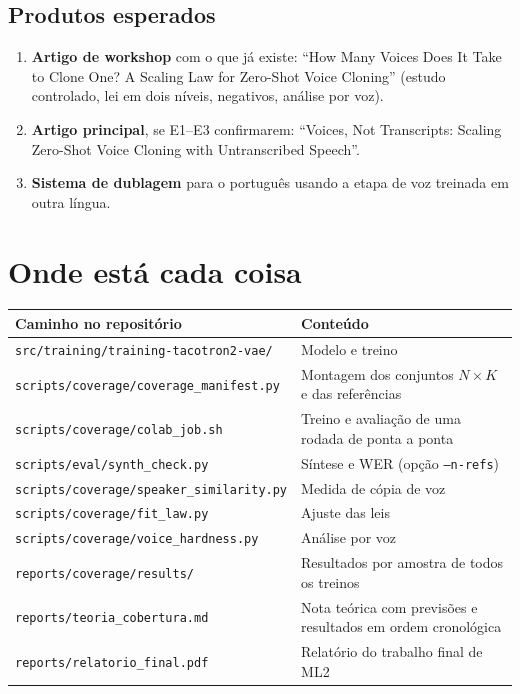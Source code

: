 \documentclass[a4paper,11pt]{article}
\begin{document}
\subsection{Produtos esperados}
\begin{enumerate}
\item \textbf{Artigo de workshop} com o que já existe: ``How Many Voices Does It Take to Clone One? A Scaling Law for Zero-Shot Voice Cloning'' (estudo controlado, lei em dois níveis, negativos, análise por voz).
\item \textbf{Artigo principal}, se E1--E3 confirmarem: ``Voices, Not Transcripts: Scaling Zero-Shot Voice Cloning with Untranscribed Speech''.
\item \textbf{Sistema de dublagem} para o português usando a etapa de voz treinada em outra língua.
\end{enumerate}

\section{Onde está cada coisa}

\begin{table}[H]
\centering\small
\begin{tabular}{@{}p{7.6cm}p{8cm}@{}}
\toprule
Caminho no repositório & Conteúdo\\
\midrule
\texttt{src/training/training-tacotron2-vae/} & Modelo e treino\\
\texttt{scripts/coverage/coverage\_manifest.py} & Montagem dos conjuntos $N\times K$ e das referências\\
\texttt{scripts/coverage/colab\_job.sh} & Treino e avaliação de uma rodada de ponta a ponta\\
\texttt{scripts/eval/synth\_check.py} & Síntese e WER (opção \texttt{--n-refs})\\
\texttt{scripts/coverage/speaker\_similarity.py} & Medida de cópia de voz\\
\texttt{scripts/coverage/fit\_law.py} & Ajuste das leis\\
\texttt{scripts/coverage/voice\_hardness.py} & Análise por voz\\
\texttt{reports/coverage/results/} & Resultados por amostra de todos os treinos\\
\texttt{reports/teoria\_cobertura.md} & Nota teórica com previsões e resultados em ordem cronológica\\
\texttt{reports/relatorio\_final.pdf} & Relatório do trabalho final de ML2\\
\bottomrule
\end{tabular}
\end{table}
\end{document}
